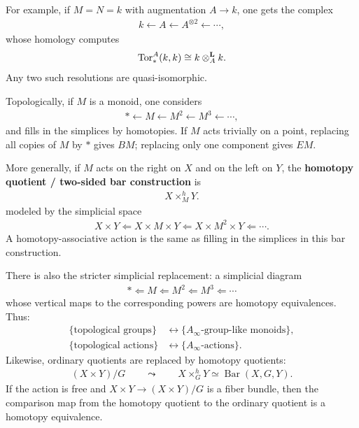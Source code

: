 \documentclass[12pt]{article}
\begin{document}
For example, if $M=N=k$ with augmentation $A \to k$, one gets the complex
\begin{align*}
    k \longleftarrow A \longleftarrow A^{\otimes 2} \longleftarrow \cdots,
\end{align*}
whose homology computes
\begin{align*}
    \operatorname{Tor}_*^A(k,k) \cong k \otimes_A^{\mathbf{L}} k.
\end{align*}
Any two such resolutions are quasi-isomorphic.

Topologically, if $M$ is a monoid, one considers
\begin{align*}
    * \longleftarrow M \longleftarrow M^2 \longleftarrow M^3 \longleftarrow \cdots,
\end{align*}
and fills in the simplices by homotopies. If $M$ acts trivially on a point, replacing all copies of $M$ by $*$ gives $BM$; replacing only one component gives $EM$.

More generally, if $M$ acts on the right on $X$ and on the left on $Y$, the \textbf{homotopy quotient / two-sided bar construction} is
\begin{align*}
    X \times_M^h Y.
\end{align*}
modeled by the simplicial space
\begin{align*}
    X \times Y \Longleftarrow X \times M \times Y \Longleftarrow X \times M^2 \times Y \Longleftarrow \cdots.
\end{align*}
A homotopy-associative action is the same as filling in the simplices in this bar construction.

There is also the stricter simplicial replacement: a simplicial diagram
\begin{align*}
    * \Longleftarrow M \Longleftarrow M^2 \Longleftarrow M^3 \Longleftarrow \cdots
\end{align*}
whose vertical maps to the corresponding powers are homotopy equivalences.
Thus:
\begin{align*}
    \{\text{topological groups}\}
    &\longleftrightarrow \{A_\infty\text{-group-like monoids}\}, \\
    \{\text{topological actions}\}
    &\longleftrightarrow \{A_\infty\text{-actions}\}.
\end{align*}
Likewise, ordinary quotients are replaced by homotopy quotients:
\begin{align*}
    (X \times Y)/G \qquad \leadsto \qquad X \times_G^h Y \simeq \operatorname{Bar}(X,G,Y).
\end{align*}
If the action is free and $X \times Y \to (X \times Y)/G$ is a fiber bundle, then the comparison map from the homotopy quotient to the ordinary quotient is a homotopy equivalence.
\end{document}
